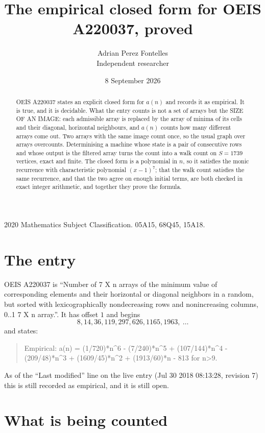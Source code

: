 \documentclass[11pt,a4paper]{article}
\title{The empirical closed form for OEIS A220037, proved}
\author{Adrian Perez Fontelles\\ \small Independent researcher}
\date{8 September 2026}
\theoremstyle{plain}
\theoremstyle{definition}
\begin{document}
\maketitle

\begin{abstract}
OEIS A220037 states an explicit closed form for $a(n)$ and records it as empirical. It is true, and
it is decidable. What the entry counts is not a set of arrays but the SIZE OF AN IMAGE: each
admissible array is replaced by the array of minima of its cells and their diagonal, horizontal neighbours,
and $a(n)$ counts how many different arrays come out. Two arrays with the same image count
once, so the usual graph over arrays overcounts. Determinising a machine whose state is a pair
of consecutive rows and whose output is the filtered array turns the count into a walk count on
$S=1739$ vertices, exact and finite. The closed form is a polynomial in $n$, so it satisfies the
monic recurrence with characteristic polynomial $(x-1)^{7}$; that the walk count
satisfies the same recurrence, and that the two agree on enough initial terms, are both checked
in exact integer arithmetic, and together they prove the formula.
\end{abstract}

\noindent\small 2020 Mathematics Subject Classification. 05A15, 68Q45, 15A18.\normalsize

\section{The entry}

OEIS A220037 is ``Number of 7 X n arrays of the minimum value of corresponding elements and their horizontal or diagonal neighbors in a random, but sorted with lexicographically nondecreasing rows and nonincreasing columns, 0..1 7 X n array.''. It has offset $1$ and begins
\[
8, 14, 36, 119, 297, 626, 1165, 1963,\ \dots
\]
and states:
\begin{quote}
Empirical: a(n) = (1/720)*n\^{}6 - (7/240)*n\^{}5 + (107/144)*n\^{}4 - (209/48)*n\^{}3 + (1609/45)*n\^{}2 + (1913/60)*n - 813 for n>9.
\end{quote}
As of the ``Last modified'' line on the live entry (Jul 30 2018 08:13:28, revision 7)
this is still recorded as empirical, and it is still open.

\section{What is being counted}
\end{document}
